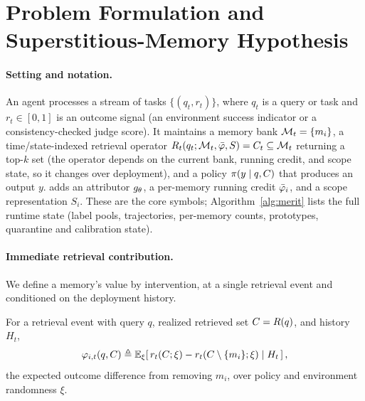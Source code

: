 \section{Problem Formulation and Superstitious-Memory Hypothesis}

\paragraph{Setting and notation.}
An agent processes a stream of tasks $\{(q_t, r_t)\}$, where $q_t$ is a query or
task and $r_t \in [0,1]$ is an outcome signal (an environment success indicator or
a consistency-checked judge score). It maintains a memory bank
$\mathcal{M}_t = \{m_i\}$, a time/state-indexed retrieval operator
$R_t(q_t;\mathcal{M}_t,\bar{\varphi},S) = C_t \subseteq \mathcal{M}_t$
returning a top-$k$ set (the operator depends on the current bank, running credit,
and scope state, so it changes over deployment), and a policy $\pi(y \mid q, C)$ that produces an
output $y$. \method{} adds an attributor $g_{\theta}$, a per-memory running credit
$\bar{\varphi}_i$, and a scope representation $S_i$. These are the core symbols;
Algorithm~\ref{alg:merit} lists the full runtime state (label pools, trajectories,
per-memory counts, prototypes, quarantine and calibration state).

\paragraph{Immediate retrieval contribution.}
We define a memory's value by intervention, at a single retrieval event and
conditioned on the deployment history.

\begin{definition}\label{def:phi}
For a retrieval event with query $q$, realized retrieved set $C=R(q)$, and
history $H_t$,
\begin{equation}
\varphi_{i,t}(q,C) \triangleq
  \mathbb{E}_\xi\!\left[\, r_t(C;\xi) - r_t(C\setminus\{m_i\};\xi) \mid H_t \,\right],
\end{equation}
the expected outcome difference from removing $m_i$, over policy and environment
randomness $\xi$.
\end{definition}

